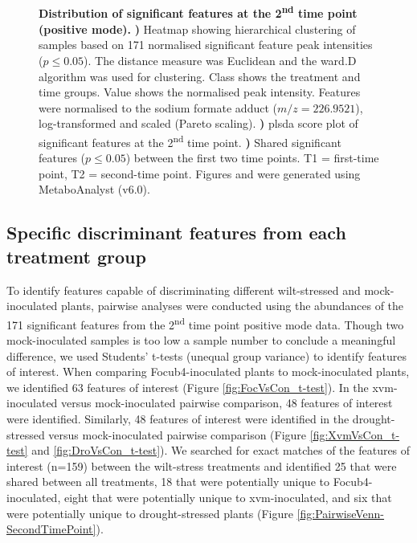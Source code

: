 \begin{figure}[!hptb]
\begin{minipage}[b]{0.57\textwidth}
\begin{subfigure}[b]{\linewidth}
   \end{subfigure}\\[\baselineskip]
  \end{minipage}
  \caption[Distribution of features at the 2\textsuperscript{nd} time point (positive mode).]{\textbf{Distribution of significant features at the 2\textsuperscript{nd} time point (positive mode).}
  \textbf{)} Heatmap showing hierarchical clustering of samples based on 171 normalised significant feature peak intensities ($p \le0.05$). The distance measure was Euclidean and the ward.D algorithm was used for clustering. Class shows the treatment and time groups. Value shows the normalised peak intensity. Features were normalised to the sodium formate   adduct ($m/z=226.9521$), log-transformed and scaled (Pareto scaling). 
  \textbf{)} \acl{plsda} score plot of significant features at the 2\textsuperscript{nd} time point. 
  \textbf{)} Shared significant features ($p \le0.05$) between the first two time points. T1 = first-time point, T2 = second-time point.
  Figures  and  were generated using MetaboAnalyst (v6.0). 
  }
  \label{fig:SecondTimePointSigFig}
\end{figure}

\subsection{Specific discriminant features from each treatment group }

To identify features capable of discriminating different wilt-stressed and mock-inoculated plants, pairwise analyses were conducted using the abundances of the 171 significant features from the 2\textsuperscript{nd} time point positive mode data. Though two mock-inoculated samples is too low a sample number to conclude a meaningful difference, we used Students' t-tests (unequal group variance) to identify features of interest. When comparing \ac{Focub4}-inoculated plants to mock-inoculated plants, we identified 63 features of interest (Figure \ref{fig:FocVsCon_t-test}). In the \ac{xvm}-inoculated versus mock-inoculated pairwise comparison, 48 features of interest were identified. Similarly, 48 features of interest were identified in the drought-stressed versus mock-inoculated pairwise comparison (Figure \ref{fig:XvmVsCon_t-test} and \ref{fig:DroVsCon_t-test}). We searched for exact matches of the features of interest (n=159) between the wilt-stress treatments and identified 25 that were shared between all treatments, 18 that were potentially unique to \ac{Focub4}-inoculated, eight that were potentially unique to \ac{xvm}-inoculated, and six that were potentially unique to drought-stressed plants (Figure \ref{fig:PairwiseVenn-SecondTimePoint}).

